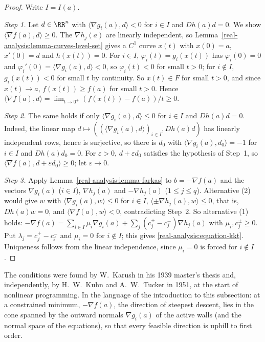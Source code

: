 \begin{proof}
Write $I = I(a)$.

\emph{Step 1.} Let $d \in \RR^n$ with $\langle\nabla g_i(a), d\rangle < 0$ for $i \in I$ and $Dh(a)d = 0$. We show $\langle\nabla f(a), d\rangle \geq 0$. The $\nabla h_j(a)$ are linearly independent, so
Lemma~\ref{real-analysis:lemma-curves-level-set} gives a $C^1$ curve $x(t)$ with $x(0) = a$, $x'(0) = d$ and $h(x(t)) = 0$. For $i \in I$, $\varphi_i(t) = g_i(x(t))$ has $\varphi_i(0) = 0$ and
$\varphi_i'(0) = \langle\nabla g_i(a), d\rangle < 0$, so $\varphi_i(t) < 0$ for small $t > 0$; for $i \notin I$, $g_i(x(t)) < 0$ for small $t$ by continuity. So $x(t) \in F$ for small $t > 0$, and since
$x(t) \to a$, $f(x(t)) \geq f(a)$ for small $t > 0$. Hence $\langle\nabla f(a), d\rangle = \lim_{t \to 0^+}(f(x(t)) - f(a))/t \geq 0$.

\emph{Step 2.} The same holds if only $\langle\nabla g_i(a), d\rangle \leq 0$ for $i \in I$ and $Dh(a)d = 0$. Indeed, the linear map $d \mapsto ((\langle\nabla g_i(a), d\rangle)_{i \in I}, Dh(a)d)$ has linearly
independent rows, hence is surjective, so there is $d_0$ with $\langle\nabla g_i(a), d_0\rangle = -1$ for $i \in I$ and $Dh(a)d_0 = 0$. For $\varepsilon > 0$, $d + \varepsilon d_0$ satisfies the hypothesis of
Step~1, so $\langle\nabla f(a), d + \varepsilon d_0\rangle \geq 0$; let $\varepsilon \to 0$.

\emph{Step 3.} Apply Lemma~\ref{real-analysis:lemma-farkas} to $b = -\nabla f(a)$ and the vectors $\nabla g_i(a)$ ($i \in I$), $\nabla h_j(a)$ and $-\nabla h_j(a)$ ($1 \leq j \leq q$). Alternative (2) would give
$w$ with $\langle\nabla g_i(a), w\rangle \leq 0$ for $i \in I$, $\langle\pm\nabla h_j(a), w\rangle \leq 0$, that is, $Dh(a)w = 0$, and $\langle\nabla f(a), w\rangle < 0$, contradicting Step~2. So alternative (1)
holds: $-\nabla f(a) = \sum_{i \in I}\mu_i\nabla g_i(a) + \sum_j(c_j^+ - c_j^-)\nabla h_j(a)$ with $\mu_i, c_j^\pm \geq 0$. Put $\lambda_j = c_j^+ - c_j^-$ and $\mu_i = 0$ for $i \notin I$; this gives
\eqref{real-analysis:equation-kkt}. Uniqueness follows from the linear independence, since $\mu_i = 0$ is forced for $i \notin I$.
\end{proof}

The conditions were found by W.~Karush in his 1939 master's thesis and, independently, by H.~W.~Kuhn and A.~W.~Tucker in 1951, at the start of nonlinear programming. In the language of the
introduction to this subsection: at a constrained minimum, $-\nabla f(a)$, the direction of steepest descent, lies in the cone spanned by the outward normals $\nabla g_i(a)$ of the active walls (and the
normal space of the equations), so that every feasible direction is uphill to first order.

